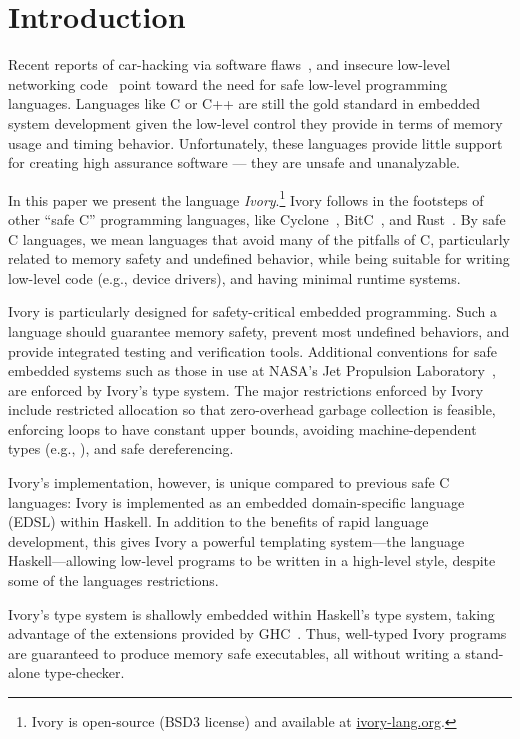 \section{Introduction}
\label{sec:introduction}

Recent reports of car-hacking via software flaws~\cite{cars11}, and insecure
low-level networking code~\cite{heartbleed} point toward the need for safe low-level programming
languages. Languages like C or C++ are still the gold standard in embedded
system development given the low-level control they provide in terms of memory
usage and timing behavior. Unfortunately, these languages provide
little support for creating high assurance software --- they are
unsafe and unanalyzable.

In this paper we present the language \emph{Ivory}.\footnote{%
Ivory is open-source (BSD3 license) and available at \url{ivory-lang.org}.}
Ivory follows in the
footsteps of other ``safe C'' programming languages, like
Cyclone~\cite{cyclone}, BitC~\cite{bitc}, and Rust~\cite{rust}. By safe C
languages, we mean languages that avoid many of the pitfalls of C, particularly
related to memory safety and undefined behavior, while being suitable for
writing low-level code (e.g., device drivers), and having minimal runtime systems.

Ivory is particularly designed for safety-critical embedded programming. Such a language
should guarantee memory safety, prevent most undefined behaviors, and provide
integrated testing and verification tools. Additional conventions for safe
embedded systems such as those in use at NASA's Jet Propulsion
Laboratory~\cite{mars}, are enforced by Ivory's type system. The major
restrictions enforced by Ivory include restricted allocation so that
zero-overhead garbage collection is feasible, enforcing loops
to have constant upper bounds, avoiding machine-dependent types (e.g., ),
and safe dereferencing.

Ivory's implementation, however, is unique compared to previous safe C
languages: Ivory is implemented as an embedded domain-specific language (EDSL)
within Haskell.  In addition to the benefits of rapid language development, this
gives Ivory a powerful templating system---the language Haskell---allowing
low-level programs to be written in a high-level style, despite some of the
languages restrictions.

Ivory's type system is shallowly embedded within Haskell's type
system, taking advantage of the extensions provided
by GHC~\cite{dephaskell}.  Thus, well-typed Ivory programs are
guaranteed to produce memory safe executables, all without writing a
stand-alone type-checker.

